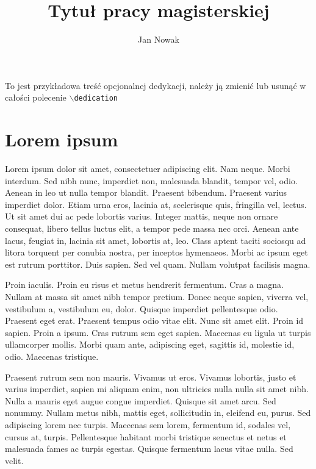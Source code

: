 \documentclass[printmode]{mgr}
\title{Tytuł pracy magisterskiej}
\author{Jan Nowak}
\begin{document}

\maketitle %

\dedication{6cm}{To jest przykładowa treść opcjonalnej dedykacji,
  należy ją zmienić lub usunąć w całości polecenie
  \texttt{$\backslash$dedication}}

\tableofcontents %

\chapter{Lorem ipsum}
Lorem ipsum dolor sit amet, consectetuer adipiscing elit. Nam
neque. Morbi interdum. Sed nibh nunc, imperdiet non, malesuada
blandit, tempor vel, odio. Aenean in leo ut nulla tempor
blandit. Praesent bibendum. Praesent varius imperdiet dolor. Etiam
urna eros, lacinia at, scelerisque quis, fringilla vel, lectus. Ut sit
amet dui ac pede lobortis varius. Integer mattis, neque non ornare
consequat, libero tellus luctus elit, a tempor pede massa nec
orci. Aenean ante lacus, feugiat in, lacinia sit amet, lobortis at,
leo. Class aptent taciti sociosqu ad litora torquent per conubia
nostra, per inceptos hymenaeos. Morbi ac ipsum eget est rutrum
porttitor. Duis sapien. Sed vel quam. Nullam volutpat facilisis magna.

Proin iaculis. Proin eu risus et metus hendrerit fermentum. Cras a
magna. Nullam at massa sit amet nibh tempor pretium. Donec neque
sapien, viverra vel, vestibulum a, vestibulum eu, dolor. Quisque
imperdiet pellentesque odio. Praesent eget erat. Praesent tempus odio
vitae elit. Nunc sit amet elit. Proin id sapien. Proin a ipsum. Cras
rutrum sem eget sapien. Maecenas eu ligula ut turpis ullamcorper
mollis. Morbi quam ante, adipiscing eget, sagittis id, molestie id,
odio. Maecenas tristique.

Praesent rutrum sem non mauris. Vivamus ut eros. Vivamus lobortis,
justo et varius imperdiet, sapien mi aliquam enim, non ultricies nulla
nulla sit amet nibh. Nulla a mauris eget augue congue
imperdiet. Quisque sit amet arcu. Sed nonummy. Nullam metus nibh,
mattis eget, sollicitudin in, eleifend eu, purus. Sed adipiscing lorem
nec turpis. Maecenas sem lorem, fermentum id, sodales vel, cursus at,
turpis. Pellentesque habitant morbi tristique senectus et netus et
malesuada fames ac turpis egestas. Quisque fermentum lacus vitae
nulla. Sed velit.
\end{document}
